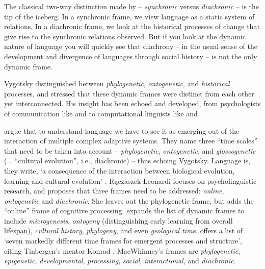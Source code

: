 The classical two-way distinction made by \citet{saussure_cours_1916} -- \textit{synchronic} versus \textit{diachronic} -- is the tip of the iceberg. In a synchronic frame, we view language as a static 
system of relations. In a diachronic frame, we look at the historical processes of change that give rise to the synchronic relations observed. But if you look at the dynamic nature of language you will quickly see that 
diachrony -- in the usual sense of the development and 
divergence of languages through social history -- is not the only dynamic frame. 



Vygotsky distinguished between \textit{phylogenetic}, \textit{ontogenetic}, and \textit{historical} processes, and stressed that 
these dynamic frames were distinct from each other yet interconnected. 
His insight has been echoed and developed, from 
psychologists of communication like \citet{tomasello_cultural_1999} and \citet{cole_phylogeny_2007} to computational linguists like \citet{steels_synthesizing_1998,steels_evolving_2003} and \citet{smith_complex_2003}. 



\citet[540]{smith_complex_2003} argue that to understand language we have to see it 
as emerging out of the interaction of multiple complex adaptive systems. They name three ``time scales'' that need to be taken into account -- \textit{phylogenetic}, \textit{ontogenetic}, and \textit{glossogenetic} 
(= ``cultural evolution'', i.e., diachronic) -- thus echoing 
Vygotsky. Language is, they write, \textquoteleft a consequence of the interaction 
between biological evolution, learning and cultural evolution' \citep[541]{smith_complex_2003}. R\k{a}czaszek-Leonardi focuses on psycholinguistic research, and proposes that three frames need to be addressed: \textit{online}, \textit{ontogenetic} and \textit{diachronic}. She leaves out the phylogenetic frame, but adds the ``online'' frame 
of cognitive processing. \citet[185]{cole_cultural_1996} expands the list of dynamic frames to include \textit{microgenesis}, \textit{ontogeny} (distinguishing early learning from 
overall lifespan), \textit{cultural history}, \textit{phylogeny}, 
and even \textit{geological time}. \citet[193--195]{macwhinney_emergence_2005} offers a list of \textquoteleft seven markedly different 
time frames for emergent processes and structure', citing Tinbergen's 
mentor Konrad \citet{lorenz_evolution_1958}. MacWhinney's frames are \textit{phylogenetic}, \textit{epigenetic}, \textit{developmental}, 
\textit{processing}, \textit{social}, \textit{interactional}, 
and \textit{diachronic}. 



